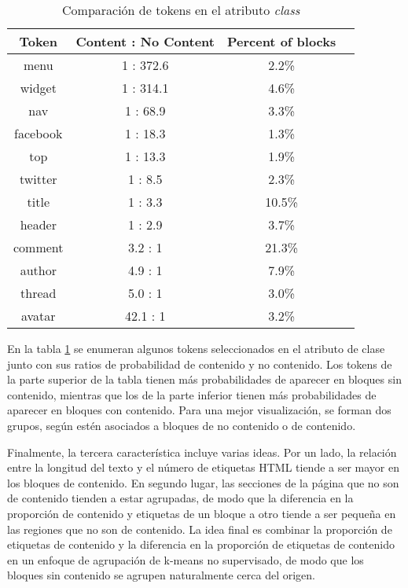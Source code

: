 \begin{table}[h]
  \begin{center}
  \begin{tabular}{| c | c | c | c |}
  \hline Token & Content : No Content & Percent of blocks  \\ \hline
  menu & 1 : 372.6 & 2.2\% \\
  widget & 1 : 314.1 & 4.6\% \\
  nav & 1 : 68.9 & 3.3\% \\
  facebook & 1 : 18.3 & 1.3\% \\
  top & 1 : 13.3 & 1.9\% \\
  twitter & 1 : 8.5 & 2.3\% \\
  title & 1 : 3.3 & 10.5\% \\
  header & 1 : 2.9 & 3.7\% \\ \hline
  comment & 3.2 : 1 & 21.3\% \\
  author & 4.9 : 1 & 7.9\% \\
  thread & 5.0 : 1 & 3.0\% \\
  avatar & 42.1 : 1 & 3.2\% \\ \hline
  \end{tabular}
  \caption{Comparación de tokens en el atributo \emph{class}}
  \label{tab:Comparacion de tokens en el atributo class}
  \end{center}
\end{table}

En la tabla \ref{tab:Comparacion de tokens en el atributo class} se enumeran algunos tokens seleccionados
en el atributo de clase junto con sus ratios de probabilidad de contenido y no contenido. Los tokens de la
parte superior de la tabla tienen más probabilidades de aparecer en bloques sin contenido, mientras que los
de la parte inferior tienen más probabilidades de aparecer en bloques con contenido. Para una mejor 
visualización, se forman dos grupos, según estén asociados a bloques de no contenido o de contenido.

Finalmente, la tercera característica incluye varias ideas. Por un lado, la relación entre la longitud del 
texto y el número de etiquetas HTML tiende a ser mayor en los bloques de contenido. En segundo lugar, las 
secciones de la página que no son de contenido tienden a estar agrupadas, de modo que la diferencia en la 
proporción de contenido y etiquetas de un bloque a otro tiende a ser pequeña en las regiones que no son de 
contenido. La idea final es combinar la proporción de etiquetas de contenido y la diferencia en la 
proporción de etiquetas de contenido en un enfoque de agrupación de k-means no supervisado, de modo que 
los bloques sin contenido se agrupen naturalmente cerca del origen.

